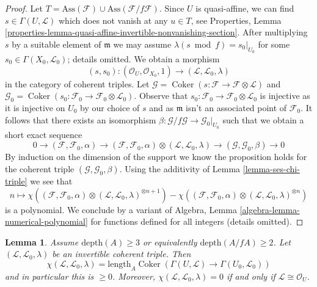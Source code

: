 \documentclass[10pt,a4paper]{amsart}
\theoremstyle{plain}
\newtheorem{lemma}[subsection]{Lemma}
\theoremstyle{definition}
\theoremstyle{remark}
\numberwithin{equation}{subsection}
\def\Coker{\mathop{\mathrm{Coker}}}
\begin{document}
\begin{proof}
\medskip\noindent
Let $T = \text{Ass}(\mathcal{F}) \cup \text{Ass}(\mathcal{F}/f\mathcal{F})$.
Since $U$ is quasi-affine, we can find $s \in \Gamma(U, \mathcal{L})$
which does not vanish at any $u \in T$, see
Properties, Lemma
\ref{properties-lemma-quasi-affine-invertible-nonvanishing-section}.
After multiplying $s$ by a suitable element of $\mathfrak m$
we may assume $\lambda(s \bmod f) = s_0|_{U_0}$ for some
$s_0 \in \Gamma(X_0, \mathcal{L}_0)$; details omitted.
We obtain a morphism
$$
(s, s_0) :
(\mathcal{O}_U, \mathcal{O}_{X_0}, 1)
\longrightarrow
(\mathcal{L}, \mathcal{L}_0, \lambda)
$$
in the category of coherent triples. Let
$\mathcal{G} = \Coker(s : \mathcal{F} \to \mathcal{F} \otimes \mathcal{L})$
and
$\mathcal{G}_0 = \Coker(s_0 : \mathcal{F}_0 \to
\mathcal{F}_0 \otimes \mathcal{L}_0)$. Observe that $s_0 : \mathcal{F}_0 \to
\mathcal{F}_0 \otimes \mathcal{L}_0$ is injective as it is injective
on $U_0$ by our choice of $s$ and as $\mathfrak m$ isn't an
associated point of $\mathcal{F}_0$. It follows that
there exists an
isomorphism $\beta : \mathcal{G}/f\mathcal{G} \to \mathcal{G}_0|_{U_0}$
such that we obtain a short exact sequence
$$
0 \to
(\mathcal{F}, \mathcal{F}_0, \alpha) \to
(\mathcal{F}, \mathcal{F}_0, \alpha) \otimes
(\mathcal{L}, \mathcal{L}_0, \lambda) \to
(\mathcal{G}, \mathcal{G}_0, \beta) \to 0
$$
By induction on the dimension of the support we know the proposition
holds for the coherent triple $(\mathcal{G}, \mathcal{G}_0, \beta)$.
Using the additivity of Lemma \ref{lemma-ses-chi-triple}
we see that
$$
n \longmapsto 
\chi((\mathcal{F}, \mathcal{F}_0, \alpha) \otimes
(\mathcal{L}, \mathcal{L}_0, \lambda)^{\otimes n + 1})
-
\chi((\mathcal{F}, \mathcal{F}_0, \alpha) \otimes
(\mathcal{L}, \mathcal{L}_0, \lambda)^{\otimes n})
$$
is a polynomial. We conclude by a variant of
Algebra, Lemma \ref{algebra-lemma-numerical-polynomial}
for functions defined for all integers (details omitted).
\end{proof}

\begin{lemma}
\label{lemma-nonnegative-chi-triple}
Assume $\text{depth}(A) \geq 3$ or equivalently
$\text{depth}(A/fA) \geq 2$. Let $(\mathcal{L}, \mathcal{L}_0, \lambda)$
be an invertible coherent triple. Then
$$
\chi(\mathcal{L}, \mathcal{L}_0, \lambda) =
\text{length}_A \Coker(\Gamma(U, \mathcal{L}) \to \Gamma(U_0, \mathcal{L}_0))
$$
and in particular this is $\geq 0$. Moreover, 
$\chi(\mathcal{L}, \mathcal{L}_0, \lambda) = 0$ if and only if
$\mathcal{L} \cong \mathcal{O}_U$.
\end{lemma}
\end{document}
